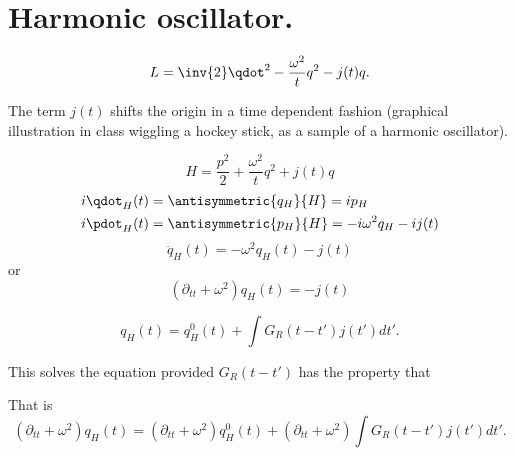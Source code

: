 %
%
\section{Harmonic oscillator.}
\begin{equation}\label{eqn:qftLecture11:320}
L = \inv{2} \qdot^2 - \frac{\omega^2}{t} q^2 - j(t) q.
\end{equation}

The term \( j(t) \) shifts the origin in a time dependent fashion (graphical illustration in class wiggling a hockey stick, as a sample of a harmonic oscillator).

\begin{equation}\label{eqn:qftLecture11:340}
H = \frac{p^2}{2} + \frac{\omega^2}{t} q^2 + j(t) q
\end{equation}
\begin{equation}\label{eqn:qftLecture11:360}
\begin{aligned}
i \qdot_H(t) &= \antisymmetric{q_H}{H} = i p_H \\
i \pdot_H(t) &= \antisymmetric{p_H}{H} = -i \omega^2 q_H - i j(t)
\end{aligned}
\end{equation}
\begin{equation}\label{eqn:qftLecture11:380}
\ddot{q}_H(t) = - \omega^2 q_H(t) - j(t)
\end{equation}
or
\begin{equation}\label{eqn:qftLecture11:400}
(\partial_{tt} + \omega^2 ) q_H(t) = - j(t)
\end{equation}

\begin{equation}\label{eqn:qftLecture11:420}
q_H(t) = q_H^0( t ) +
\int G_R(t - t') j(t') dt'.
\end{equation}

This solves the equation provided \( G_R(t - t') \) has the property that

That is
\begin{equation}\label{eqn:qftLecture11:460}
(\partial_{tt} + \omega^2)
q_H(t) =
(\partial_{tt} + \omega^2)
q_H^0( t )
+
(\partial_{tt} + \omega^2)
\int G_R(t - t') j(t') dt'.
\end{equation}

